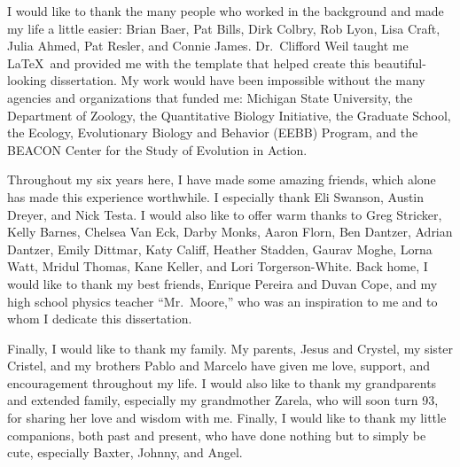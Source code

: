 \begin{acknowledgment}
I would like to thank the many people who worked in the background
and made my life a little easier: Brian Baer, Pat Bills, Dirk Colbry, Rob Lyon,
Lisa Craft, Julia Ahmed, Pat Resler, and Connie James.
%
Dr.~Clifford Weil taught me \LaTeX\ and provided me with the template that
helped create this beautiful-looking dissertation.
%
My work would have been impossible without the many agencies and organizations
that funded me: Michigan State University, the Department of Zoology,
the Quantitative Biology Initiative, the Graduate School,
the Ecology, Evolutionary Biology and Behavior (EEBB) Program,
and the BEACON Center for the Study of Evolution in Action.



Throughout my six years here, I have made some amazing friends,
which alone has made this experience worthwhile.
%
I especially thank Eli Swanson, Austin Dreyer, and Nick Testa.
%
I would also like to offer warm thanks to Greg Stricker, Kelly Barnes,
Chelsea Van Eck, Darby Monks, Aaron Florn, Ben Dantzer, Adrian Dantzer,
Emily Dittmar, Katy Califf, Heather Stadden, Gaurav Moghe, Lorna Watt,
Mridul Thomas, Kane Keller, and Lori Torgerson-White.
%
Back home, I would like to thank my best friends,
Enrique Pereira and Duvan Cope,
and my high school physics teacher ``Mr.\ Moore,''
who was an inspiration to me and to whom I dedicate this dissertation.



Finally, I would like to thank my family.
%
My parents, Jesus and Crystel,
my sister Cristel, and my brothers Pablo and Marcelo
have given me love, support, and encouragement throughout my life.
%
I would also like to thank my grandparents and extended family,
especially my grandmother Zarela, who will soon turn 93,
for sharing her love and wisdom with me.
%
Finally, I would like to thank my little companions,
both past and present, who have done nothing but to simply be cute,
especially Baxter, Johnny, and Angel.

\end{acknowledgment}
